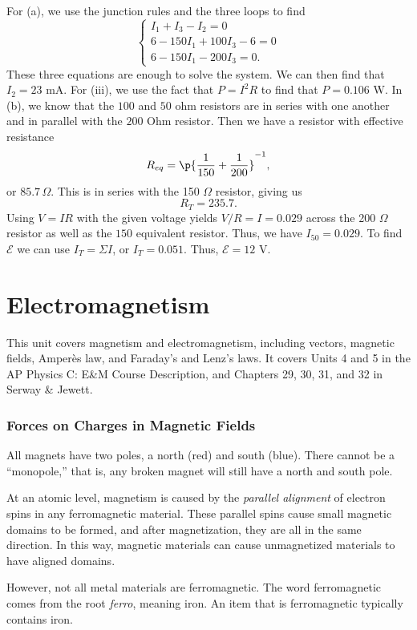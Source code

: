 \documentclass[11pt]{article}
\begin{document}
\begin{solution}
    For (a), we use the junction rules and the three loops to find
    \[\begin{cases}
        I_1 + I_3 - I_2 = 0 \\
        6 - 150I_1 + 100I_3 - 6 = 0 \\
        6 - 150I_1 - 200I_3 = 0.
    \end{cases}\]
    These three equations are enough to solve the system. We can then find that $I_2 = 23$ mA. For (iii), we use the fact that $P = I^2R$ to find that $P = 0.106$ W. In (b), we know that the $100$ and $50$ ohm resistors are in series with one another and in parallel with the $200$ Ohm resistor. Then we have a resistor with effective resistance
    \[R_{eq} = \p{\frac{1}{150} + \frac{1}{200}}^{-1},\]
    or $85.7\,\Omega$. This is in series with the 150 $\Omega$ resistor, giving us
    \[R_{T} = 235.7.\]
    Using $V = IR$ with the given voltage yields $V/R = I = 0.029$ across the 200 $\Omega$ resistor as well as the $150$ equivalent resistor. Thus, we have $I_{50} = 0.029$. To find $\mathcal{E}$ we can use $I_T = \Sigma I$, or $I_T = 0.051$. Thus, $\mathcal{E} = 12$ V.
\end{solution}


\part{Electromagnetism}
This unit covers magnetism and electromagnetism, including vectors, magnetic fields, Amper\` es law, and Faraday's and Lenz's laws. It covers Units 4 and 5 in the AP Physics C: E\&M Course Description, and Chapters 29, 30, 31, and 32 in Serway \& Jewett.

\section{Forces on Charges in Magnetic Fields}
All magnets have two poles, a north (red) and south (blue). There cannot be a ``monopole,'' that is, any broken magnet will still have a north and south pole.

At an atomic level, magnetism is caused by the \textit{parallel alignment} of electron spins in any ferromagnetic material. These parallel spins cause small magnetic domains to be formed, and after magnetization, they are all in the same direction. In this way, magnetic materials can cause unmagnetized materials to have aligned domains.

However, not all metal materials are ferromagnetic. The word ferromagnetic comes from the root \textit{ferro}, meaning iron. An item that is ferromagnetic typically contains iron.
\end{document}
